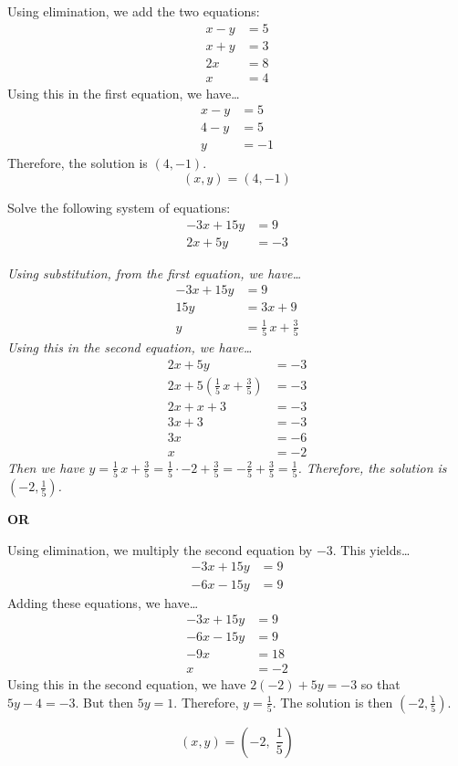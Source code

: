 \documentclass[12pt,letterpaper]{exam}
\begin{document}
\begin{questions}
{Using elimination, we add the two equations:
	\[
	\begin{aligned}
	x - y&= 5 \\
	x + y&= 3 \\ \hline
	2x&= 8 \\
	x&= 4
	\end{aligned}
	\]
Using this in the first equation, we have\dots
	\[
	\begin{aligned}
	x - y&= 5 \\
	4 - y&= 5 \\
	y&= -1
	\end{aligned}
	\]
Therefore, the solution is $(4, -1)$. \pspace
	\[
	\boxed{(x, y)= (4, -1)}
	\]
}





\newpage
\question[5] Solve the following system of equations:
	\[
	\begin{aligned}
	-3x + 15y&= 9 \\
	2x + 5y&= -3
	\end{aligned}
	\] \pspace

{\itshape Using substitution, from the first equation, we have\dots
	\[
	\begin{aligned}
	-3x + 15y&= 9 \\
	15y&= 3x + 9 \\
	y&= \frac{1}{5}\,x + \frac{3}{5}
	\end{aligned}
	\]
Using this in the second equation, we have\dots
	\[
	\begin{aligned}
	2x + 5y&= -3 \\
	2x + 5 \left( \frac{1}{5}\,x + \frac{3}{5} \right)&= -3 \\
	2x + x + 3&= -3 \\
	3x + 3&= -3 \\
	3x&= -6 \\
	x&= -2
	\end{aligned}
	\]
Then we have $y= \frac{1}{5}\, x + \frac{3}{5}= \frac{1}{5} \cdot -2 + \frac{3}{5}= -\frac{2}{5} + \frac{3}{5}= \frac{1}{5}$. Therefore, the solution is $(-2, \frac{1}{5})$. 

	\begin{center} {\bfseries OR} \end{center}

Using elimination, we multiply the second equation by $-3$. This yields\dots
	\[
	\begin{aligned}
	-3x + 15y&= 9 \\
	-6x - 15y&= 9
	\end{aligned}
	\]
Adding these equations, we have\dots
	\[
	\begin{aligned}
	-3x + 15y&= 9 \\
	-6x - 15y&= 9 \\ \hline
	-9x&= 18 \\
	x&= -2
	\end{aligned}
	\]
Using this in the second equation, we have $2(-2) + 5y= -3$ so that $5y - 4= -3$. But then $5y= 1$. Therefore, $y= \frac{1}{5}$. The solution is then $(-2, \frac{1}{5})$. \pspace

	\[
	\boxed{(x, y)= \left( -2,\; \frac{1}{5} \right)}
	\]
}


\end{questions}
\end{document}
